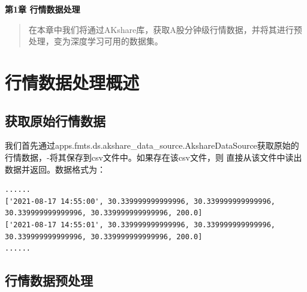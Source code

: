 \newpage
\maketitle
\begin{center}
\Large \textbf{第1章 行情数据处理} \quad 
\end{center}
\begin{abstract}
在本章中我们将通过AKshare库，获取A股分钟级行情数据，并将其进行预处理，变为深度学习可用的数据集。
\end{abstract}
\section{行情数据处理概述}
\subsection{获取原始行情数据}
我们首先通过apps.fmts.ds.akshare\_data\_source.AkshareDataSource获取原始的行情数据，-将其保存到csv文件中。如果存在该csv文件，则
直接从该文件中读出数据并返回。数据格式为：
\begin{lstlisting}
......
['2021-08-17 14:55:00', 30.339999999999996, 30.339999999999996, 30.339999999999996, 30.339999999999996, 200.0]
['2021-08-17 14:55:01', 30.339999999999996, 30.339999999999996, 30.339999999999996, 30.339999999999996, 200.0]
......
\end{lstlisting}
\subsection{行情数据预处理}
